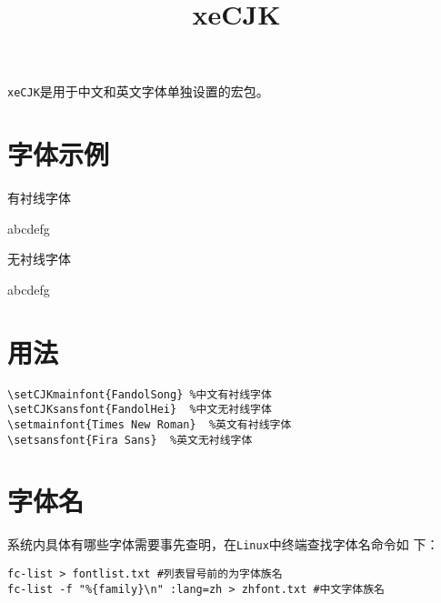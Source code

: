 \documentclass[UTF8]{article}
\title{xeCJK}
\date{}
\begin{document}
\maketitle

\texttt{xeCJK}是用于中文和英文字体单独设置的宏包。

\section{字体示例}

\textrm{有衬线字体}

\textrm{abcdefg}

\textsf{无衬线字体}

\textsf{abcdefg}

\section{用法}
\begin{verbatim}    
\setCJKmainfont{FandolSong} %中文有衬线字体
\setCJKsansfont{FandolHei}  %中文无衬线字体
\setmainfont{Times New Roman}  %英文有衬线字体
\setsansfont{Fira Sans}  %英文无衬线字体
\end{verbatim}    

\section{字体名}
系统内具体有哪些字体需要事先查明，在\texttt{Linux}中终端查找字体名命令如
下：

\begin{verbatim}
fc-list > fontlist.txt #列表冒号前的为字体族名
fc-list -f "%{family}\n" :lang=zh > zhfont.txt #中文字体族名
\end{verbatim}
\end{document}
